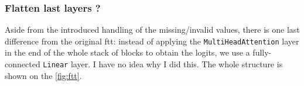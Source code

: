 \subsubsection{Flatten last layers ?}


Aside from the introduced handling of the missing/invalid values, there is one last difference from the original
\gls{ftt}: instead of applying the \verb|MultiHeadAttention| layer in the end of the whole stack of blocks to obtain
the logits, we use a fully-connected \verb|Linear| layer. I have no idea why I did this. The whole structure is shown
on the \autoref{fig:ftt}.

